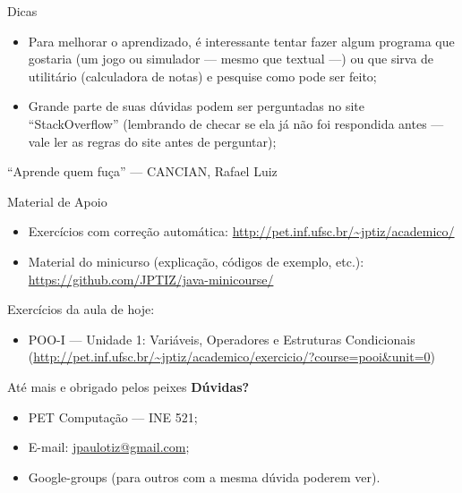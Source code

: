 \documentclass{beamer}
\begin{document}
\begin{frame}{Dicas}
    \begin{itemize}
        \item Para melhorar o aprendizado, é interessante tentar fazer algum
            programa que gostaria (um jogo ou simulador --- mesmo que textual
            ---) ou que sirva de utilitário (calculadora de notas) e pesquise
            como pode ser feito;
        \item Grande parte de suas dúvidas podem ser perguntadas no site
            ``StackOverflow'' (lembrando de checar se ela já não foi respondida
            antes --- vale ler as regras do site antes de perguntar);
    \end{itemize}

    \footnotesize ``Aprende quem fuça'' --- CANCIAN, Rafael Luiz
\end{frame}

\begin{frame}{Material de Apoio}
    \begin{itemize}
        \item Exercícios com correção automática:
            \url{http://pet.inf.ufsc.br/~jptiz/academico/}
        \item Material do minicurso (explicação, códigos de exemplo, etc.):
            \url{https://github.com/JPTIZ/java-minicourse/}
    \end{itemize}

    Exercícios da aula de hoje:
    \begin{itemize}
        \item POO-I --- Unidade 1: Variáveis, Operadores e Estruturas
            Condicionais
            (\url{http://pet.inf.ufsc.br/~jptiz/academico/exercicio/?course=pooi&unit=0})
    \end{itemize}
\end{frame}

\begin{frame}{Até mais e obrigado pelos peixes}
    \textbf{Dúvidas?}
    \begin{itemize}
        \item PET Computação --- INE 521;
        \item E-mail: \url{jpaulotiz@gmail.com};
        \item Google-groups (para outros com a mesma dúvida poderem ver).
    \end{itemize}
\end{frame}
\end{document}
